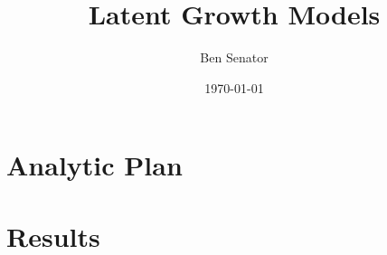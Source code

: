 \documentclass[11pt]{article}
\begin{document}
\title{Latent Growth Models}
\author{Ben Senator}
\date{\today}

\maketitle

\section{Analytic Plan}

\section{Results}
\end{document}
